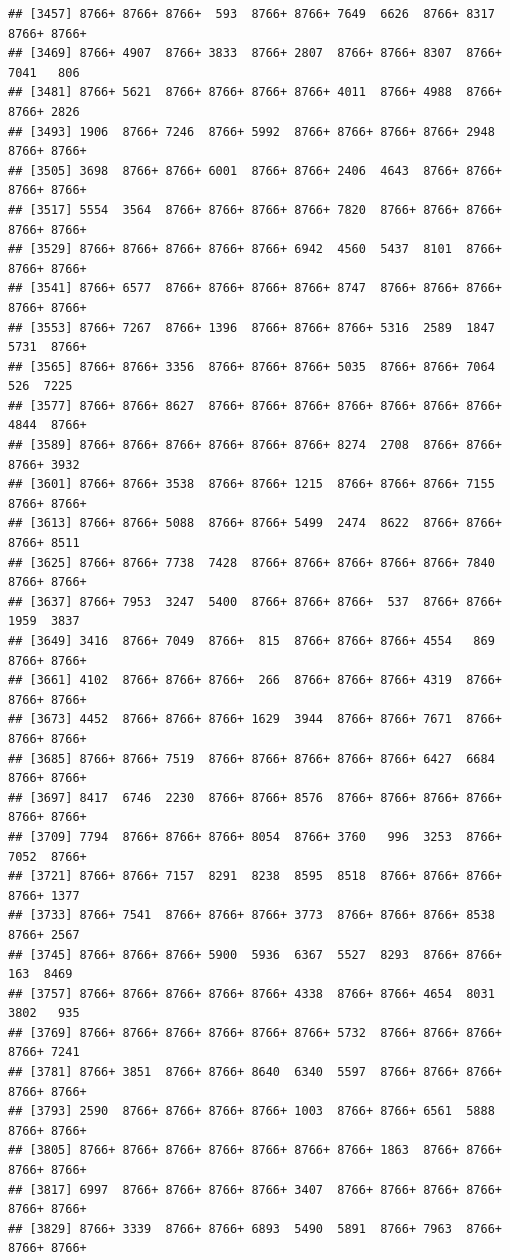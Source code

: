 \documentclass[
]{book}
\begin{document}
\begin{verbatim}
## [3457] 8766+ 8766+ 8766+  593  8766+ 8766+ 7649  6626  8766+ 8317  8766+ 8766+
## [3469] 8766+ 4907  8766+ 3833  8766+ 2807  8766+ 8766+ 8307  8766+ 7041   806 
## [3481] 8766+ 5621  8766+ 8766+ 8766+ 8766+ 4011  8766+ 4988  8766+ 8766+ 2826 
## [3493] 1906  8766+ 7246  8766+ 5992  8766+ 8766+ 8766+ 8766+ 2948  8766+ 8766+
## [3505] 3698  8766+ 8766+ 6001  8766+ 8766+ 2406  4643  8766+ 8766+ 8766+ 8766+
## [3517] 5554  3564  8766+ 8766+ 8766+ 8766+ 7820  8766+ 8766+ 8766+ 8766+ 8766+
## [3529] 8766+ 8766+ 8766+ 8766+ 8766+ 6942  4560  5437  8101  8766+ 8766+ 8766+
## [3541] 8766+ 6577  8766+ 8766+ 8766+ 8766+ 8747  8766+ 8766+ 8766+ 8766+ 8766+
## [3553] 8766+ 7267  8766+ 1396  8766+ 8766+ 8766+ 5316  2589  1847  5731  8766+
## [3565] 8766+ 8766+ 3356  8766+ 8766+ 8766+ 5035  8766+ 8766+ 7064   526  7225 
## [3577] 8766+ 8766+ 8627  8766+ 8766+ 8766+ 8766+ 8766+ 8766+ 8766+ 4844  8766+
## [3589] 8766+ 8766+ 8766+ 8766+ 8766+ 8766+ 8274  2708  8766+ 8766+ 8766+ 3932 
## [3601] 8766+ 8766+ 3538  8766+ 8766+ 1215  8766+ 8766+ 8766+ 7155  8766+ 8766+
## [3613] 8766+ 8766+ 5088  8766+ 8766+ 5499  2474  8622  8766+ 8766+ 8766+ 8511 
## [3625] 8766+ 8766+ 7738  7428  8766+ 8766+ 8766+ 8766+ 8766+ 7840  8766+ 8766+
## [3637] 8766+ 7953  3247  5400  8766+ 8766+ 8766+  537  8766+ 8766+ 1959  3837 
## [3649] 3416  8766+ 7049  8766+  815  8766+ 8766+ 8766+ 4554   869  8766+ 8766+
## [3661] 4102  8766+ 8766+ 8766+  266  8766+ 8766+ 8766+ 4319  8766+ 8766+ 8766+
## [3673] 4452  8766+ 8766+ 8766+ 1629  3944  8766+ 8766+ 7671  8766+ 8766+ 8766+
## [3685] 8766+ 8766+ 7519  8766+ 8766+ 8766+ 8766+ 8766+ 6427  6684  8766+ 8766+
## [3697] 8417  6746  2230  8766+ 8766+ 8576  8766+ 8766+ 8766+ 8766+ 8766+ 8766+
## [3709] 7794  8766+ 8766+ 8766+ 8054  8766+ 3760   996  3253  8766+ 7052  8766+
## [3721] 8766+ 8766+ 7157  8291  8238  8595  8518  8766+ 8766+ 8766+ 8766+ 1377 
## [3733] 8766+ 7541  8766+ 8766+ 8766+ 3773  8766+ 8766+ 8766+ 8538  8766+ 2567 
## [3745] 8766+ 8766+ 8766+ 5900  5936  6367  5527  8293  8766+ 8766+  163  8469 
## [3757] 8766+ 8766+ 8766+ 8766+ 8766+ 4338  8766+ 8766+ 4654  8031  3802   935 
## [3769] 8766+ 8766+ 8766+ 8766+ 8766+ 8766+ 5732  8766+ 8766+ 8766+ 8766+ 7241 
## [3781] 8766+ 3851  8766+ 8766+ 8640  6340  5597  8766+ 8766+ 8766+ 8766+ 8766+
## [3793] 2590  8766+ 8766+ 8766+ 8766+ 1003  8766+ 8766+ 6561  5888  8766+ 8766+
## [3805] 8766+ 8766+ 8766+ 8766+ 8766+ 8766+ 8766+ 1863  8766+ 8766+ 8766+ 8766+
## [3817] 6997  8766+ 8766+ 8766+ 8766+ 3407  8766+ 8766+ 8766+ 8766+ 8766+ 8766+
## [3829] 8766+ 3339  8766+ 8766+ 6893  5490  5891  8766+ 7963  8766+ 8766+ 8766+

\end{verbatim}
\end{document}
